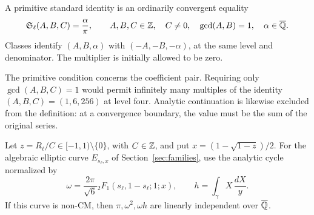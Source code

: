 \begin{definition}
A primitive standard identity is an ordinarily convergent equality
\[
 \mathfrak S_\ell(A,B,C)=\frac\alpha\pi,
 \qquad A,B,C\in\mathbb Z,\quad C\ne0,\quad\gcd(A,B)=1,
 \quad\alpha\in\overline{\mathbb Q}.
\]
Classes identify $(A,B,\alpha)$ with $(-A,-B,-\alpha)$, at the same
level and denominator. The multiplier is initially allowed to be zero.
\end{definition}

The primitive condition concerns the coefficient pair. Requiring only
$\gcd(A,B,C)=1$ would permit infinitely many multiples of the identity
$(A,B,C)=(1,6,256)$ at level four. Analytic continuation is likewise
excluded from the definition: at a convergence boundary, the value must
be the sum of the original series.

\begin{hypothesis}\label{hyp:QPI}
Let $z=R_\ell/C\in[-1,1)\setminus\{0\}$, with $C\in\mathbb Z$, and put
$x=(1-\sqrt{1-z})/2$. For the algebraic elliptic curve $E_{s_\ell,x}$
of Section~\ref{sec:families}, use the analytic cycle normalized by
\[
 \omega=\frac{2\pi}{\sqrt6}
 {}_2F_1(s_\ell,1-s_\ell;1;x),
 \qquad h=\int_\gamma X\,\frac{dX}{y}.
\]
If this curve is non-CM, then $\pi,\omega^2,\omega h$ are linearly
independent over $\overline{\mathbb Q}$.
\end{hypothesis}

